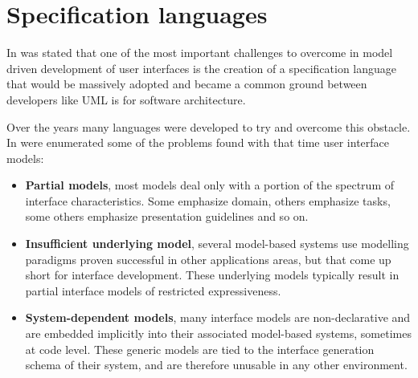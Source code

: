 \section{Specification languages}
\label{section:specification_languages}

In \cite{idealxml2} was stated that one of the most important challenges to overcome in model driven development of user interfaces is the creation of a specification language that would be massively adopted and became a common ground between developers like UML is for software architecture.

Over the years many languages were developed to try and overcome this obstacle. In \cite{mecano} were enumerated some of the problems found with that time user interface models:
\begin{itemize}
\item \textbf{Partial models}, most models deal only with a portion of the spectrum of interface characteristics. Some emphasize domain, others emphasize tasks, some others emphasize presentation guidelines and so on.

\item \textbf{Insufficient underlying model}, several model-based systems use modelling paradigms proven successful in other applications areas, but that come up short for interface development. These underlying models typically result in partial interface models of restricted expressiveness.

\item \textbf{System-dependent models}, many interface models are non-declarative and are embedded implicitly into their associated model-based systems, sometimes at code level. These generic models are tied to the interface generation schema of their system, and are therefore unusable in any other environment.

\end{itemize}


